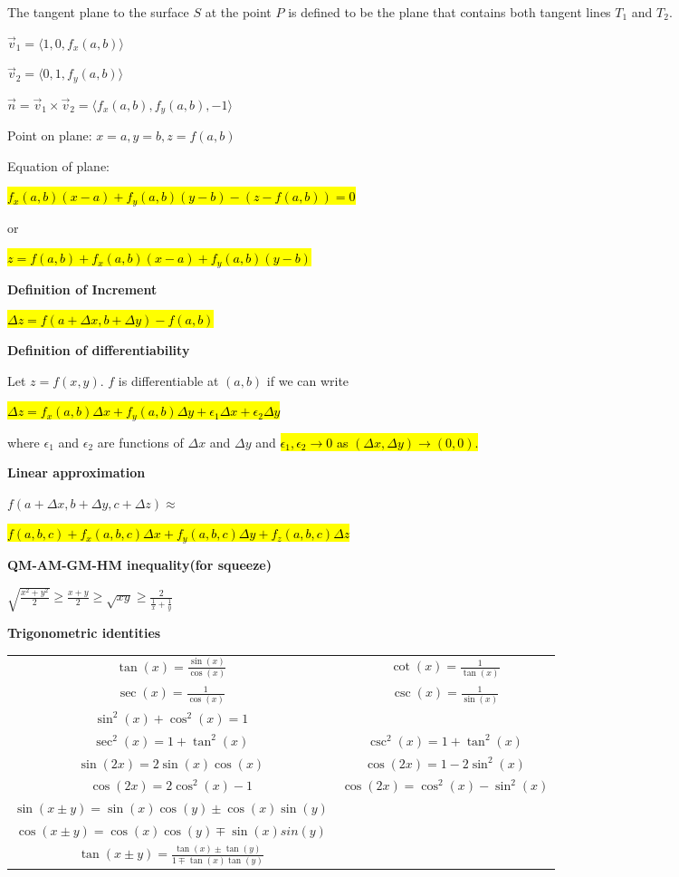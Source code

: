 \documentclass{article}
\def\*#1{\vec{#1}}
\begin{document}
\begin{multicols*}{4}
The tangent plane to the surface $S$ at the point $P$ is defined to be the plane that contains both tangent lines $T_1$ and $T_2$.

\centerline{$\*v_1= \langle 1,0,f_x(a,b) \rangle $}
\centerline{$\*v_2= \langle 0,1,f_y(a,b) \rangle $}
\centerline{$\*n = \*v_1\times\*v_2=\langle f_x(a,b),f_y(a,b),-1 \rangle$}

Point on plane: $x=a, y=b, z=f(a,b)$

Equation of plane: 

\centerline{\hl{$f_x(a,b)(x-a)+f_y(a,b)(y-b)-(z-f(a,b))=0$}}
\centerline{or}
\centerline{\hl{$z=f(a,b)+f_x(a,b)(x-a)+f_y(a,b)(y-b)$}}

\textbf{Definition of Increment}

\centerline{\hl{$\Delta z=f(a+\Delta x,b+\Delta y)-f(a,b)$}}

\textbf{Definition of differentiability}

Let $z=f(x,y)$. $f$ is differentiable at $(a,b)$ if we can write

\centerline{\hl{$\Delta z=f_x(a,b)\Delta x+f_y(a,b)\Delta y + \epsilon _1 \Delta x+\epsilon _2 \Delta y$}}

where $\epsilon _1$ and $\epsilon _2$ are functions of $\Delta x$ and $\Delta y$ and \hl{$\epsilon _1,\epsilon _2 \to 0$ as $(\Delta x,\Delta y)\to(0,0)$.}

\textbf{Linear approximation}

\centerline{$f(a+\Delta x,b+\Delta y, c+\Delta z)\approx$}
\centerline{\hl{$f(a,b,c)+f_x(a,b,c)\Delta x+f_y(a,b,c)\Delta y+f_z(a,b,c)\Delta z$}}

\vfill\null
\columnbreak

\textbf{QM-AM-GM-HM inequality(for squeeze)}

$\sqrt{\frac{x^2+y^2}{2}}\geq \frac{x+y}{2} \geq \sqrt{xy} \geq \frac{2}{\frac{1}{x}+\frac{1}{y}}$

\textbf{Trigonometric identities}
\begin{center}
\begin{tabular}{c c}	
    $\tan(x)=\frac{\sin(x)}{\cos(x)}$ & $\cot(x)=\frac{1}{\tan(x)}$\\
    $\sec(x)=\frac{1}{\cos(x)}$ & $\csc(x)=\frac{1}{\sin(x)}$  \\
    $\sin^2(x)+\cos^2(x)=1$ & \\
    $\sec^2(x)=1+\tan^2(x)$ &  $\csc^2(x)=1+\tan^2(x)$\\
    $\sin(2x)=2\sin(x)\cos(x)$ & $\cos(2x)=1-2\sin^2(x)$\\
    $\cos(2x)=2\cos^2(x)-1$& $\cos(2x)=\cos^2(x)-\sin^2(x)$\\
    $\sin(x\pm y)=\sin(x)\cos(y)\pm\cos(x)\sin(y)$\\
    $\cos(x\pm y)=\cos(x)\cos(y) \mp\sin(x)sin(y)$\\
    $\tan(x\pm y)=\frac{\tan(x)\pm\tan(y)}{1\mp\tan(x)\tan(y)}$\\
\end{tabular}
\end{center}


\end{multicols*}
\end{document}
